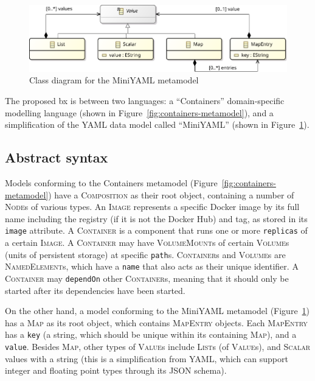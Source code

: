 \documentclass[sigconf,review]{acmart}
\begin{document}
\begin{figure}
  \centering
  \includegraphics[width=\columnwidth]{miniyaml-metamodel}
  \caption{Class diagram for the MiniYAML metamodel}%
  \label{fig:miniyaml-metamodel}
\end{figure}

The proposed bx is between two languages: a ``Containers'' domain-specific
modelling language (shown in Figure~\ref{fig:containers-metamodel}), and a
simplification of the YAML data model called ``MiniYAML'' (shown in
Figure~\ref{fig:miniyaml-metamodel}).

\subsection{Abstract syntax}
\label{sec:abstract-syntax}

\newcommand*{\metaclass}[1]{\textsc{#1}}
\newcommand*{\feature}[1]{\texttt{#1}}

Models conforming to the Containers metamodel
(Figure~\ref{fig:containers-metamodel}) have a \metaclass{Composition} as their
root object, containing a number of \metaclass{Node}s of various types. An
\metaclass{Image} represents a specific Docker image by its full name including
the registry (if it is not the Docker Hub) and tag, as stored in its
\feature{image} attribute. A \metaclass{Container} is a component that runs one
or more \feature{replicas} of a certain \metaclass{Image}. A
\metaclass{Container} may have \metaclass{Volume\-Mount}s of certain
\metaclass{Volume}s (units of persistent storage) at specific \feature{path}s.
\metaclass{Container}s and \metaclass{Volume}s are \metaclass{NamedElement}s,
which have a \feature{name} that also acts as their unique identifier. A
\metaclass{Container} may \feature{dependOn} other \metaclass{Container}s,
meaning that it should only be started after its dependencies have been started.

On the other hand, a model conforming to the MiniYAML metamodel
(Figure~\ref{fig:miniyaml-metamodel}) has a \metaclass{Map} as its root object,
which contains \metaclass{MapEntry} objects. Each \metaclass{MapEntry} has a
\feature{key} (a string, which should be unique within its containing
\metaclass{Map}), and a \feature{value}. Besides \metaclass{Map}, other types of
\metaclass{Value}s include \metaclass{List}s (of \metaclass{Value}s), and
\metaclass{Scalar} values with a string (this is a simplification from YAML,
which can support integer and floating point types through its JSON schema).
\end{document}
